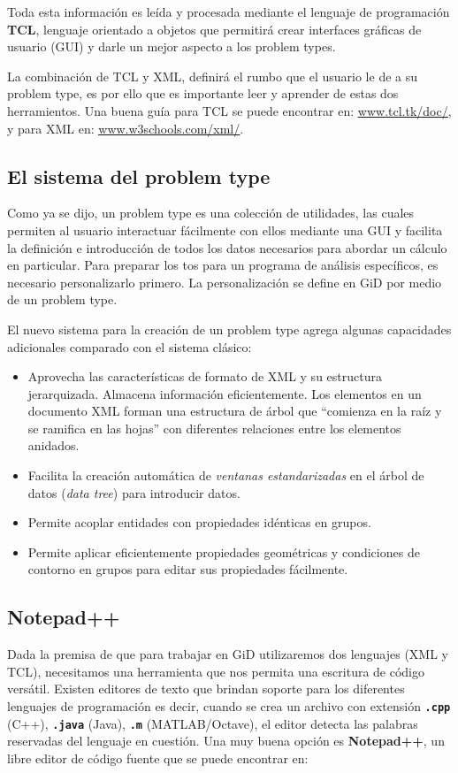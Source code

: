 \documentclass[10pt, a4paper, twocolumn]{article} %
\begin{document}
Toda esta información es leída y procesada mediante el lenguaje de programación \textbf{TCL}, lenguaje orientado a objetos que permitirá crear interfaces gráficas de usuario (GUI) y darle un mejor aspecto a los problem types.

La combinación de TCL y XML, definirá el rumbo que el usuario le de a su problem type, es por ello que es importante leer y aprender de estas dos herramientos. Una buena guía para TCL se puede encontrar en: \textcolor{BlueGiD}{\underline{\url{www.tcl.tk/doc/}}}, y para XML en: \textcolor{BlueGiD}{\underline{\url{www.w3schools.com/xml/}}}.

\subsection{El sistema del problem type}

Como ya se dijo, un problem type es una colección de utilidades, las cuales permiten al usuario interactuar fácilmente con ellos mediante una GUI y facilita la definición e introducción de todos los datos necesarios para abordar un cálculo en particular. Para preparar los tos para un programa de análisis específicos, es necesario personalizarlo primero. La personalización se define en GiD por medio de un problem type.

El nuevo sistema para la creación de un problem type agrega algunas capacidades adicionales comparado con el sistema clásico:

\begin{itemize}
	\item Aprovecha las características de formato de XML y su estructura jerarquizada. Almacena información eficientemente. Los elementos en un documento XML forman una estructura de árbol que ``comienza en la raíz y se ramifica en las hojas'' con diferentes relaciones entre los elementos anidados.
	\item Facilita la creación automática de \textit{ventanas estandarizadas} en el árbol de datos (\textit{data tree}) para introducir datos.
	\item Permite acoplar entidades con propiedades idénticas en grupos.
	\item Permite aplicar eficientemente propiedades geométricas y condiciones de contorno en grupos para editar sus propiedades fácilmente.
\end{itemize}

\subsection{Notepad++}
Dada la premisa de que para trabajar en GiD utilizaremos dos lenguajes (XML y TCL), necesitamos una herramienta que nos permita una escritura de código versátil. Existen editores de texto que brindan soporte para los diferentes lenguajes de programación es decir, cuando se crea un archivo con extensión \textbf{\texttt{.cpp}} (C++), \textbf{\texttt{.java}} (Java), \textbf{\texttt{.m}} (MATLAB/Octave), el editor detecta las palabras reservadas del lenguaje en cuestión. Una muy buena opción es \textbf{Notepad++}, un libre editor de código fuente que se puede encontrar en:\\ 
\end{document}
